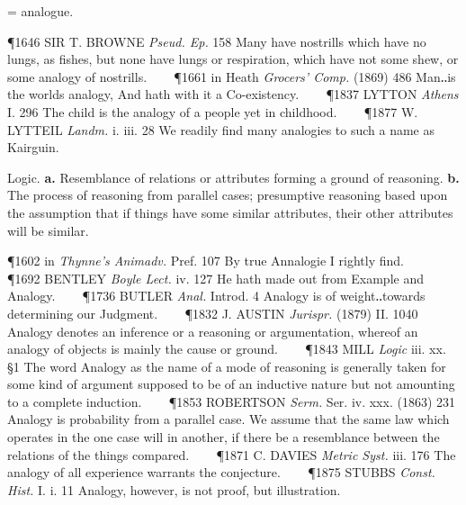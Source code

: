 \begin{description}[wide, labelwidth=!, labelindent=0pt]
\begin{myenumerate}
 = analogue. 

\P 1646 SIR T. BROWNE \textit{Pseud. Ep.} 158 Many have nostrills which have no lungs, as fishes, but none have lungs or respiration, which have not some shew, or some analogy of nostrills.    
\P 1661 in Heath \textit{Grocers' Comp.} (1869) 486 Man‥is the worlds analogy, And hath with it a Co-existency.    
\P 1837 LYTTON \textit{Athens} I. 296 The child is the analogy of a people yet in childhood.    
\P 1877 W. LYTTEIL \textit{Landm.} i. iii. 28 We readily find many analogies to such a name as Kairguin.

 Logic. \textbf{a.} Resemblance of relations or attributes forming a ground of reasoning. \textbf{b.} The process of reasoning from parallel cases; presumptive reasoning based upon the assumption that if things have some similar attributes, their other attributes will be similar. 

\P 1602 in \textit{Thynne's Animadv.} Pref. 107 By true Annalogie I rightly find.    
\P 1692 BENTLEY \textit{Boyle Lect.} iv. 127 He hath made out from Example and Analogy.    
\P 1736 BUTLER \textit{Anal.} Introd. 4 Analogy is of weight‥towards determining our Judgment.    
\P 1832 J. AUSTIN \textit{Jurispr.} (1879) II. 1040 Analogy denotes an inference or a reasoning or argumentation, whereof an analogy of objects is mainly the cause or ground.    
\P 1843 MILL \textit{Logic} iii. xx. §1 The word Analogy as the name of a mode of reasoning is generally taken for some kind of argument supposed to be of an inductive nature but not amounting to a complete induction.    
\P 1853 ROBERTSON \textit{Serm.} Ser. iv. xxx. (1863) 231 Analogy is probability from a parallel case. We assume that the same law which operates in the one case will in another, if there be a resemblance between the relations of the things compared.    
\P 1871 C. DAVIES \textit{Metric Syst.} iii. 176 The analogy of all experience warrants the conjecture.    
\P 1875 STUBBS \textit{Const. Hist.} I. i. 11 Analogy, however, is not proof, but illustration.


\end{myenumerate}
\end{description}
